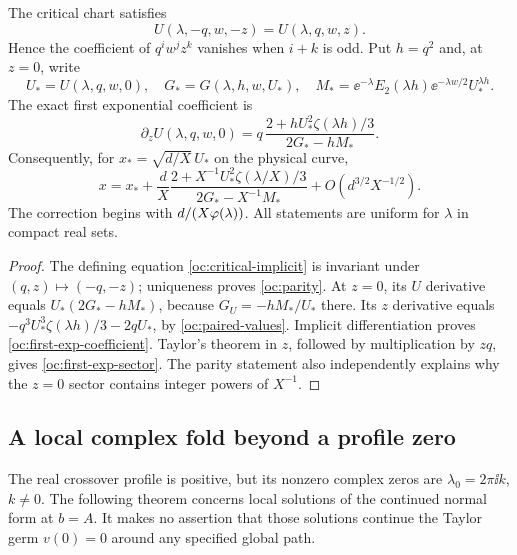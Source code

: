 \begin{proposition}
\label{prop:critical-support}
The critical chart satisfies
\begin{equation}\label{oc:parity}
 U(\lambda,-q,w,-z)=U(\lambda,q,w,z).
\end{equation}
Hence the coefficient of $q^iw^jz^k$ vanishes when $i+k$ is odd.
Put $h=q^2$ and, at $z=0$, write
\[
 U_*=U(\lambda,q,w,0),\quad G_*=G(\lambda,h,w,U_*),\quad
 M_*=\ee^{-\lambda}E_2(\lambda h)
             \ee^{-\lambda w/2}U_*^{\lambda h}.
\]
The exact first exponential coefficient is
\begin{equation}\label{oc:first-exp-coefficient}
 \partial_zU(\lambda,q,w,0)
 =q\,\frac{2+hU_*^2\zeta(\lambda h)/3}{2G_*-hM_*}.
\end{equation}
Consequently, for $x_*=\sqrt{d/X}\,U_*$ on the physical curve,
\begin{equation}\label{oc:first-exp-sector}
 x=x_*+\frac dX
       \frac{2+X^{-1}U_*^2\zeta(\lambda/X)/3}
            {2G_*-X^{-1}M_*}
       +O\left(d^{3/2}X^{-1/2}\right).
\end{equation}
The correction begins with $d/(X\varphi(\lambda))$. All statements
are uniform for $\lambda$ in compact real sets.
\end{proposition}

\begin{proof}
The defining equation \eqref{oc:critical-implicit} is invariant
under $(q,z)\mapsto(-q,-z)$; uniqueness proves \eqref{oc:parity}.
At $z=0$, its $U$ derivative equals
$U_*(2G_*-hM_*)$, because $G_U=-hM_*/U_*$ there.
Its $z$ derivative equals
$-q^3U_*^3\zeta(\lambda h)/3-2qU_*$, by
\eqref{oc:paired-values}. Implicit differentiation proves
\eqref{oc:first-exp-coefficient}. Taylor's theorem in $z$, followed
by multiplication by $zq$, gives \eqref{oc:first-exp-sector}.
The parity statement also independently explains why the
$z=0$ sector contains integer powers of $X^{-1}$.
\end{proof}

\subsection{A local complex fold beyond a profile zero}

The real crossover profile is positive, but its nonzero complex
zeros are $\lambda_0=2\pi\ii k$, $k\ne0$. The following theorem
concerns local solutions of the continued normal form at $b=A$.
It makes no assertion that those solutions continue the Taylor germ
$v(0)=0$ around any specified global path.

